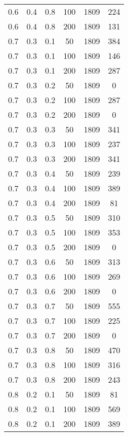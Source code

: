 \begin{center}
\begin{longtable}[c]{|c|c|c|c|c|c|}
		0.6 &  0.4 &  0.8 &  100 &  1809 &   224 \\
		0.6 &  0.4 &  0.8 &  200 &  1809 &   131 \\
	   \hline
		0.7 &  0.3 &  0.1 &   50 &  1809 &   384 \\
		0.7 &  0.3 &  0.1 &  100 &  1809 &   146 \\
		0.7 &  0.3 &  0.1 &  200 &  1809 &   287 \\
	   \hline
		0.7 &  0.3 &  0.2 &   50 &  1809 &     0 \\
		0.7 &  0.3 &  0.2 &  100 &  1809 &   287 \\
		0.7 &  0.3 &  0.2 &  200 &  1809 &     0 \\
	   \hline
		0.7 &  0.3 &  0.3 &   50 &  1809 &   341 \\
		0.7 &  0.3 &  0.3 &  100 &  1809 &   237 \\
		0.7 &  0.3 &  0.3 &  200 &  1809 &   341 \\
	   \hline
		0.7 &  0.3 &  0.4 &   50 &  1809 &   239 \\
		0.7 &  0.3 &  0.4 &  100 &  1809 &   389 \\
		0.7 &  0.3 &  0.4 &  200 &  1809 &    81 \\
	   \hline
		0.7 &  0.3 &  0.5 &   50 &  1809 &   310 \\
		0.7 &  0.3 &  0.5 &  100 &  1809 &   353 \\
		0.7 &  0.3 &  0.5 &  200 &  1809 &     0 \\
	   \hline
		0.7 &  0.3 &  0.6 &   50 &  1809 &   313 \\
		0.7 &  0.3 &  0.6 &  100 &  1809 &   269 \\
		0.7 &  0.3 &  0.6 &  200 &  1809 &     0 \\
	   \hline
		0.7 &  0.3 &  0.7 &   50 &  1809 &   555 \\
		0.7 &  0.3 &  0.7 &  100 &  1809 &   225 \\
		0.7 &  0.3 &  0.7 &  200 &  1809 &     0 \\
	   \hline
		0.7 &  0.3 &  0.8 &   50 &  1809 &   470 \\
		0.7 &  0.3 &  0.8 &  100 &  1809 &   316 \\
		0.7 &  0.3 &  0.8 &  200 &  1809 &   243 \\
	   \hline
		0.8 &  0.2 &  0.1 &   50 &  1809 &    81 \\
		0.8 &  0.2 &  0.1 &  100 &  1809 &   569 \\
		0.8 &  0.2 &  0.1 &  200 &  1809 &   389 \\
	   \hline

\end{longtable}
\end{center}
